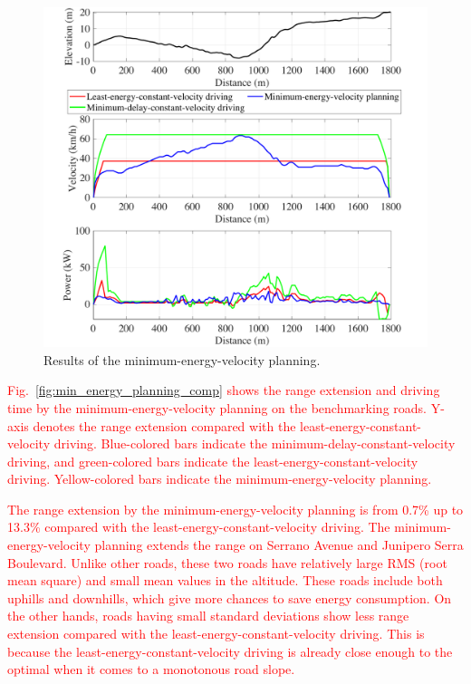 \documentclass{IEEEtran}
\begin{document}
\begin{figure}[h] %
\centering
\includegraphics[width=\hsize]{Figures/energy_driving_profile_best.pdf}
\caption{Results of the minimum-energy-velocity planning.}
\label{fig:no_deadline_trace}
\end{figure} 

\textcolor{red}{Fig.~\ref{fig:min_energy_planning_comp} shows the range extension and driving time by the minimum-energy-velocity planning on the benchmarking roads. Y-axis denotes the range extension compared with the least-energy-constant-velocity driving. Blue-colored bars indicate the minimum-delay-constant-velocity driving, and green-colored bars indicate the least-energy-constant-velocity driving. Yellow-colored bars indicate the minimum-energy-velocity planning.}

\textcolor{red}{The range extension by the minimum-energy-velocity planning is from 0.7\% up to 13.3\% compared with the least-energy-constant-velocity driving. 
The minimum-energy-velocity planning extends the range on Serrano Avenue and Junipero Serra Boulevard. Unlike other roads, these two roads have relatively large RMS (root mean square) and small mean values in the altitude. These roads include both uphills and downhills, which give more chances to save energy consumption.
On the other hands, roads having small standard deviations show less range extension compared with the least-energy-constant-velocity driving. This is because the least-energy-constant-velocity driving is already close enough to the optimal when it comes to a monotonous road slope.}
\end{document}
